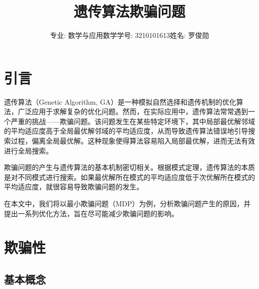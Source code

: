 \documentclass[journal=gmj]{report}%
\theoremstyle{definition}
\numberwithin{equation}{section}
\begin{document}
\begin{Frontmatter}
\center
    
\title[Article Title]{遗传算法欺骗问题}

\author{专业: 数学与应用数学\quad 学号: 3210101613\quad 姓名: 罗俊勋}



\end{Frontmatter}

\section*{引言}

遗传算法（Genetic Algorithm, GA）是一种模拟自然选择和遗传机制的优化算法，广泛应用于求解复杂的优化问题。然而，在实际应用中，遗传算法常常遇到一个严重的挑战——欺骗问题。该问题发生在某些特定环境下，其中局部最优解邻域的平均适应度高于全局最优解邻域的平均适应度，从而导致遗传算法错误地引导搜索过程，偏离全局最优解。这种现象使得算法容易陷入局部最优解，进而无法有效进行全局搜索。

欺骗问题的产生与遗传算法的基本机制密切相关。根据模式定理，遗传算法的本质是对不同模式进行搜索。如果最优解所在模式的平均适应度低于次优解所在模式的平均适应度，就很容易导致欺骗问题的发生。

在本文中，我们将以最小欺骗问题（MDP）为例，分析欺骗问题产生的原因，并提出一系列优化方法，旨在尽可能减少欺骗问题的影响。

\localtableofcontents

\section{欺骗性}

\subsection{基本概念}
\end{document}
